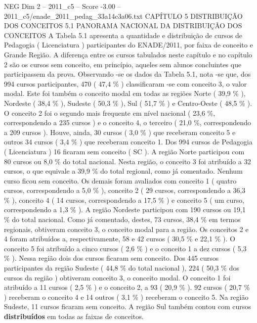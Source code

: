 \begin{textsample}{NEG Dim 2 – 2011\_c5 – Score -3.00 – 2011\_c5/enade\_2011\_pedag\_33a14c3a06.txt}  \label{ex:f2_neg_082}
CAPÍTULO 5 DISTRIBUIÇÃO DOS CONCEITOS 5.1 PANORAMA NACIONAL DA DISTRIBUIÇÃO DOS CONCEITOS A Tabela 5.1 apresenta a quantidade e distribuição de cursos de Pedagogia ( Licenciatura ) participantes do ENADE/2011, por faixa de conceito e Grande Região.
A diferença entre os cursos tabulados neste capítulo e no capítulo 2 são os cursos sem conceito, em princípio, aqueles sem alunos concluintes que participassem da prova.
Observando -se os dados da Tabela 5.1, nota -se que, dos 994 cursos participantes, 470 ( 47,4 \% ) classificaram -se com conceito 3, o valor modal.
Este foi também o conceito modal em todas as regiões Norte ( 39,9 \% ), Nordeste ( 38,4 \% ), Sudeste ( 50,3 \% ), Sul ( 51,7 \% ) e Centro-Oeste ( 48,5 \% ).
O conceito 2 foi o segundo mais frequente em nível nacional ( 23,6 \%, correspondendo a 235 cursos ) e o conceito 4, o terceiro ( 21,0 \%, correspondendo a 209 cursos ).
Houve, ainda, 30 cursos ( 3,0 \% ) que receberam conceito 5 e outros 34 cursos ( 3,4 \% ) que receberam conceito 1.
Dos 994 cursos de Pedagogia ( Licenciatura ) 16 ficaram sem conceito ( SC ).
A região Norte participou com 80 cursos ou 8,0 \% do total nacional.
Nesta região, o conceito 3 foi atribuído a 32 cursos, o que equivale a 39,9 \% do total regional, como já comentado.
Nenhum curso ficou sem conceito.
Os demais foram avaliados com conceito 1 ( quatro cursos, correspondendo a 5,0 \% ), conceito 2 ( 29 cursos, correspondendo a 36,3 \% ), conceito 4 ( 14 cursos, correspondendo a 17,5 \% ) e conceito 5 ( um curso, correspondendo a 1,3 \% ).
A região Nordeste participou com 190 cursos ou 19,1 \% do total nacional.
Como já comentado, destes, 73 cursos, 38,4 \% em termos regionais, obtiveram conceito 3, o conceito modal para a região.
Os conceitos 2 e 4 foram atribuídos a, respectivamente, 58 e 42 cursos ( 30,5 \% e 22,1 \% ).
O conceito 5 foi atribuído a cinco cursos ( 2,6 \% ) e o conceito 1 a dez cursos ( 5,3 \% ).
Nessa região dois dos cursos ficaram sem conceito.
Dos 445 cursos participantes da região Sudeste ( 44,8 \% do total nacional ), 224 ( 50,3 \% dos cursos da região ) obtiveram conceito 3, o conceito modal.
O conceito 1 foi atribuído a 11 cursos ( 2,5 \% ) e o conceito 2, a 93 ( 20,9 \% ). 92 cursos ( 20,7 \% ) receberam o conceito 4 e 14 outros ( 3,1 \% ) receberam o conceito 5.
Na região Sudeste, 11 cursos ficaram sem conceito.
A região Sul também contou com cursos \textbf{distribuídos} em todas as faixas de conceitos.

\end{textsample}

